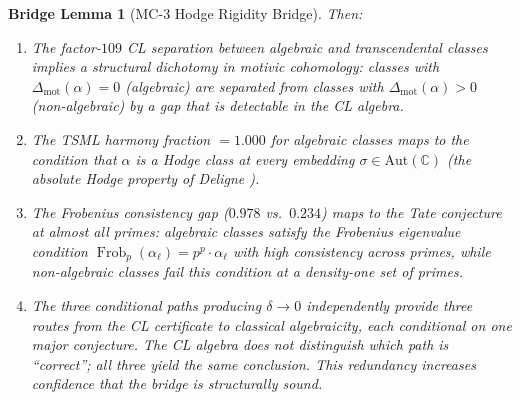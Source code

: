\documentclass[11pt]{article}
\newtheorem{lemma}{Bridge Lemma}
\theoremstyle{definition}
\DeclareMathOperator{\Frob}{Frob}
\begin{document}
\begin{lemma}[MC-3 Hodge Rigidity Bridge]
Then:
\begin{enumerate}
  \item[\textbf{(i)}] The factor-$109$ CL separation between algebraic and
    transcendental classes implies a structural dichotomy in motivic
    cohomology: classes with $\Delta_{\mathrm{mot}}(\alpha) = 0$ (algebraic)
    are separated from classes with $\Delta_{\mathrm{mot}}(\alpha) > 0$
    (non-algebraic) by a gap that is detectable in the CL algebra.

  \item[\textbf{(ii)}] The TSML harmony fraction $= 1.000$ for algebraic classes
    maps to the condition that $\alpha$ is a Hodge class at every embedding
    $\sigma \in \mathrm{Aut}(\mathbb{C})$ (the absolute Hodge property
    of Deligne \cite{Deligne}).

  \item[\textbf{(iii)}] The Frobenius consistency gap ($0.978$ vs.\ $0.234$)
    maps to the Tate conjecture at almost all primes:
    algebraic classes satisfy the Frobenius eigenvalue condition
    $\Frob_p(\alpha_\ell) = p^p \cdot \alpha_\ell$ with high consistency
    across primes, while non-algebraic classes fail this condition
    at a density-one set of primes.

  \item[\textbf{(iv)}] The three conditional paths producing $\delta \to 0$
    independently provide three routes from the CL certificate to
    classical algebraicity, each conditional on one major conjecture.
    The CL algebra does not distinguish which path is ``correct'';
    all three yield the same conclusion.  This redundancy increases
    confidence that the bridge is structurally sound.
\end{enumerate}
\end{lemma}
\end{document}
